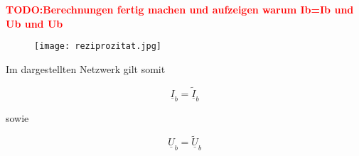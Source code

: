 \textcolor{red}{\textbf{TODO:Berechnungen fertig machen und aufzeigen warum Ib=Ib und Ub und Ub}}	

\begin{figure}[H]
	\centering
	\texttt{[image: reziprozitat.jpg]}
	\label{fig:reziprozitat}
\end{figure}

Im dargestellten Netzwerk gilt somit

\begin{equation}\label{equ:verticImpedance}
			\underline{I}_b =  \underline{\tilde{I}}_b
		\end{equation}
		
sowie 		
		
\begin{equation}\label{equ:verticImpedance}
			\underline{U}_b =  \underline{\widetilde{U}}_b
		\end{equation}

\newpage



